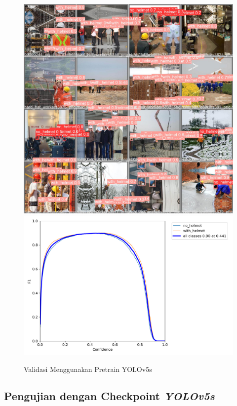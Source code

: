 \begin{figure}[ht]
  \centering
  \includegraphics[scale=0.1]{gambar/train_v2_val/HelmetDetection_yolov5n2/val_batch0_pred.jpg}
  \includegraphics[scale=0.3]{gambar/train_v2_val/HelmetDetection_yolov5n2/F1_curve.png}
  \caption{Validasi Menggunakan Pretrain YOLOv5s}
  \label{fig:valyolov5n}  
\end{figure}

\subsection{Pengujian dengan Checkpoint \emph{YOLOv5s}}
\label{subsec:ujiyolo5s}

